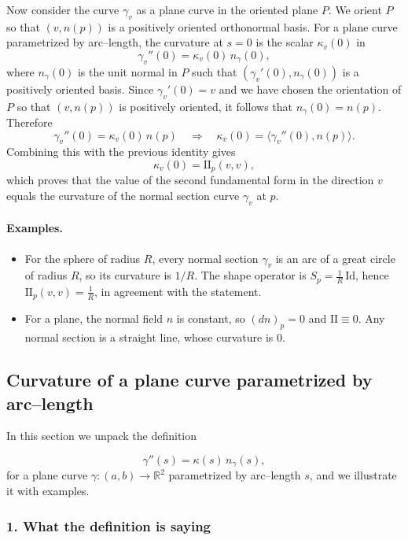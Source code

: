 \documentclass[12pt,a4paper]{article}
\theoremstyle{plain}
\theoremstyle{definition}      %
\begin{document}
	Now consider the curve $\gamma_v$ as a plane curve in the oriented plane $P$.
	We orient $P$ so that $(v,n(p))$ is a positively oriented orthonormal basis.
	For a plane curve parametrized by arc--length, the curvature at $s=0$ is the
	scalar $\kappa_v(0)$ in
	\[
	\gamma_v''(0) = \kappa_v(0)\,n_\gamma(0),
	\]
	where $n_\gamma(0)$ is the unit normal in $P$ such that
	$(\gamma_v'(0),n_\gamma(0))$ is a positively oriented basis.  Since
	$\gamma_v'(0)=v$ and we have chosen the orientation of $P$ so that
	$(v,n(p))$ is positively oriented, it follows that $n_\gamma(0)=n(p)$.
	Therefore
	\[
	\gamma_v''(0) = \kappa_v(0)\,n(p)
	\quad\Longrightarrow\quad
	\kappa_v(0) = \big\langle \gamma_v''(0),n(p)\big\rangle.
	\]
	Combining this with the previous identity gives
	\[
	\kappa_v(0)=\mathrm{II}_p(v,v),
	\]
	which proves that the value of the second fundamental form in the direction $v$
	equals the curvature of the normal section curve $\gamma_v$ at $p$.
	
	\paragraph{Examples.}
	\begin{itemize}
		\item For the sphere of radius $R$, every normal section $\gamma_v$ is an arc
		of a great circle of radius $R$, so its curvature is $1/R$.  The shape
		operator is $S_p = \frac{1}{R}\,\mathrm{Id}$, hence
		$\mathrm{II}_p(v,v)=\frac{1}{R}$, in agreement with the statement.
		\item For a plane, the normal field $n$ is constant, so $(dn)_p=0$ and
		$\mathrm{II}\equiv 0$.  Any normal section is a straight line, whose
		curvature is $0$.
	\end{itemize}
	
	\subsection*{Curvature of a plane curve parametrized by arc--length}
	
	In this section we unpack the definition
	
	\[
	\gamma''(s) = \kappa(s)\,n_\gamma(s),
	\]
	for a plane curve $\gamma:(a,b)\to\mathbb{R}^2$ parametrized by arc--length $s$,
	and we illustrate it with examples.
	
	\subsubsection*{1. What the definition is saying}
	
\end{document}
